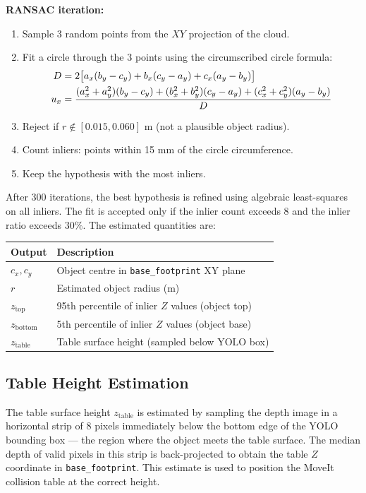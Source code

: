 \textbf{RANSAC iteration:}
\begin{enumerate}[noitemsep]
  \item Sample 3 random points from the $XY$ projection of the cloud.
  \item Fit a circle through the 3 points using the circumscribed circle formula:
        \begin{align}
          D &= 2\bigl[a_x(b_y - c_y) + b_x(c_y - a_y) + c_x(a_y - b_y)\bigr] \notag \\
          u_x &= \frac{(a_x^2+a_y^2)(b_y-c_y) + (b_x^2+b_y^2)(c_y-a_y) + (c_x^2+c_y^2)(a_y-b_y)}{D}
        \end{align}
  \item Reject if $r \notin [0.015, 0.060]$ m (not a plausible object radius).
  \item Count inliers: points within 15 mm of the circle circumference.
  \item Keep the hypothesis with the most inliers.
\end{enumerate}

After 300 iterations, the best hypothesis is refined using algebraic least-squares on
all inliers.
The fit is accepted only if the inlier count exceeds 8 and the inlier ratio exceeds
$30\%$.
The estimated quantities are:

\begin{center}
\begin{tabular}{ll}
\toprule
\textbf{Output} & \textbf{Description} \\
\midrule
$c_x, c_y$ & Object centre in \texttt{base\_footprint} XY plane \\
$r$ & Estimated object radius (m) \\
$z_{\text{top}}$ & 95th percentile of inlier $Z$ values (object top) \\
$z_{\text{bottom}}$ & 5th percentile of inlier $Z$ values (object base) \\
$z_{\text{table}}$ & Table surface height (sampled below YOLO box) \\
\bottomrule
\end{tabular}
\end{center}

\subsection{Table Height Estimation}

The table surface height $z_{\text{table}}$ is estimated by sampling the depth image
in a horizontal strip of 8 pixels immediately below the bottom edge of the YOLO
bounding box — the region where the object meets the table surface.
The median depth of valid pixels in this strip is back-projected to obtain the table $Z$
coordinate in \texttt{base\_footprint}.
This estimate is used to position the MoveIt collision table at the correct height.

